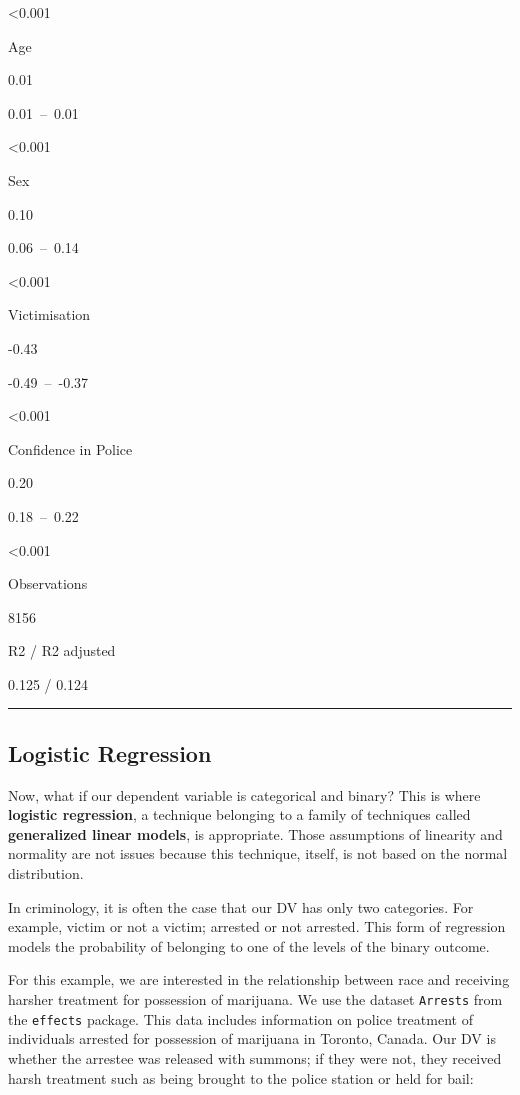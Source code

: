 \documentclass[
]{book}
\begin{document}
\textless0.001

Age

0.01

0.01~--~0.01

\textless0.001

Sex

0.10

0.06~--~0.14

\textless0.001

Victimisation

-0.43

-0.49~--~-0.37

\textless0.001

Confidence in Police

0.20

0.18~--~0.22

\textless0.001

Observations

8156

R2 / R2 adjusted

0.125 / 0.124

\begin{center}\rule{0.5\linewidth}{0.5pt}\end{center}

\hypertarget{logistic-regression}{%
\subsection{Logistic Regression}\label{logistic-regression}}

Now, what if our dependent variable is categorical and binary? This is where \textbf{logistic regression}, a technique belonging to a family of techniques called \textbf{generalized linear models}, is appropriate. Those assumptions of linearity and normality are not issues because this technique, itself, is not based on the normal distribution.

In criminology, it is often the case that our DV has only two categories. For example, victim or not a victim; arrested or not arrested. This form of regression models the probability of belonging to one of the levels of the binary outcome.

For this example, we are interested in the relationship between race and receiving harsher treatment for possession of marijuana. We use the dataset \texttt{Arrests} from the \texttt{effects} package. This data includes information on police treatment of individuals arrested for possession of marijuana in Toronto, Canada. Our DV is whether the arrestee was released with summons; if they were not, they received harsh treatment such as being brought to the police station or held for bail:
\end{document}
